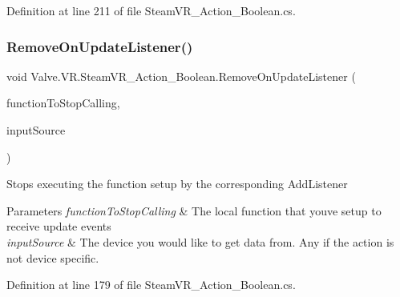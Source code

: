 Definition at line 211 of file Steam\+V\+R\+\_\+\+Action\+\_\+\+Boolean.\+cs.

\mbox{\label{class_valve_1_1_v_r_1_1_steam_v_r___action___boolean_a25fd219a2b7375d1182cedf9922dd2b1}} 
\subsubsection{\texorpdfstring{RemoveOnUpdateListener()}{RemoveOnUpdateListener()}}
{\footnotesize\ttfamily void Valve.\+V\+R.\+Steam\+V\+R\+\_\+\+Action\+\_\+\+Boolean.\+Remove\+On\+Update\+Listener (\begin{DoxyParamCaption}\item[{\mbox{\hyperlink{class_valve_1_1_v_r_1_1_steam_v_r___action___boolean_ab9ee21a88a5d5d23603465c55796fcf5}{Update\+Handler}}}]{function\+To\+Stop\+Calling,  }\item[{\mbox{\hyperlink{namespace_valve_1_1_v_r_a82e5bf501cc3aa155444ee3f0662853f}{Steam\+V\+R\+\_\+\+Input\+\_\+\+Sources}}}]{input\+Source }\end{DoxyParamCaption})}



Stops executing the function setup by the corresponding Add\+Listener 


\begin{DoxyParams}{Parameters}
{\em function\+To\+Stop\+Calling} & The local function that you\textquotesingle{}ve setup to receive update events\\
\hline
{\em input\+Source} & The device you would like to get data from. Any if the action is not device specific.\\
\hline
\end{DoxyParams}


Definition at line 179 of file Steam\+V\+R\+\_\+\+Action\+\_\+\+Boolean.\+cs.

\mbox{\label{class_valve_1_1_v_r_1_1_steam_v_r___action___boolean_a529f46e4f0459edb2641bbb382d10614}} 
